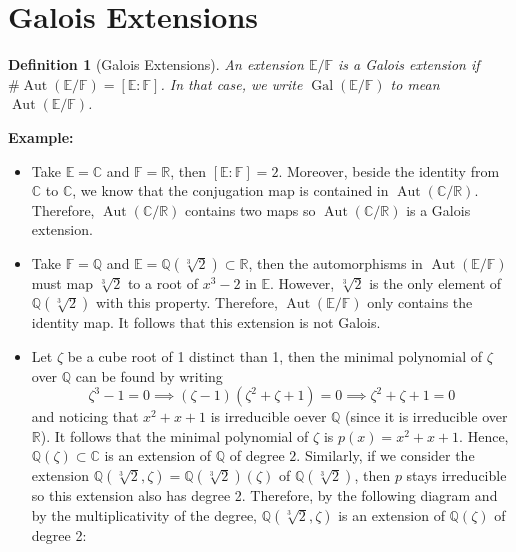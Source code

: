 \documentclass{article}
\newtheorem*{definition}{Definition}
\newcommand{\C}{\mathbb{C}}
\newcommand{\R}{\mathbb{R}}
\newcommand{\Q}{\mathbb{Q}}
\newcommand{\F}{\mathbb{F}}
\newcommand{\E}{\mathbb{E}}
\DeclareMathOperator{\Aut}{\text{Aut}}
\DeclareMathOperator{\Gal}{\text{Gal}}
\newenvironment{example}{\noindent\textbf{Example:} \vspace{-0.2cm}\begin{itemize}}{\end{itemize}}
\begin{document}
\section{Galois Extensions} \label{galois_extensions}

\begin{definition}[Galois Extensions]
    An extension $\E / \F$ is a Galois extension if $\# \Aut(\E / \F) = [\E : \F]$. In that case, we write $\Gal(\E / \F)$ to mean $\Aut(\E / \F)$.
\end{definition}

\begin{example}
    \item Take $\E = \C$ and $\F = \R$, then $[\E : \F] = 2$. Moreover, beside the identity from $\C$ to $\C$, we know that the conjugation map is contained in $\Aut(\C / \R)$. Therefore, $\Aut(\C / \R)$ contains two maps so $\Aut(\C / \R)$ is a Galois extension. 
    \item Take $\F = \Q$ and $\E = \Q(\sqrt[3]{2}) \subset \R$, then the automorphisms in $\Aut(\E / \F)$ must map $\sqrt[3]{2}$ to a root of $x^3 - 2$ in $\E$. However, $\sqrt[3]{2}$ is the only element of $\Q(\sqrt[3]{2})$ with this property. Therefore, $\Aut(\E / \F)$ only contains the identity map. It follows that this extension is not Galois.
    \item Let $\zeta$ be a cube root of 1 distinct than 1, then the minimal polynomial of $\zeta$ over $\Q$ can be found by writing
    $$\zeta^3 - 1 = 0 \implies (\zeta - 1)(\zeta^2 + \zeta + 1) = 0 \implies \zeta^2 + \zeta + 1 = 0$$
    and noticing that $x^2 + x + 1$ is irreducible oever $\Q$ (since it is irreducible over $\R$). It follows that the minimal polynomial of $\zeta$ is $p(x) = x^2 + x + 1$. Hence, $\Q(\zeta) \subset \C$ is an extension of $\Q$ of degree $2$. Similarly, if we consider the extension $\Q(\sqrt[3]{2}, \zeta) = \Q(\sqrt[3]{2})(\zeta)$ of $\Q(\sqrt[3]{2})$, then $p$ stays irreducible so this extension also has degree 2. Therefore, by the following diagram and by the multiplicativity of the degree, $\Q(\sqrt[3]{2}, \zeta)$ is an extension of $\Q(\zeta)$ of degree 2:
    \begin{center}
\end{center}
\end{example}
\end{document}
